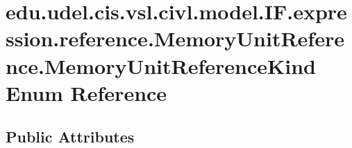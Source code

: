 \hypertarget{enumedu_1_1udel_1_1cis_1_1vsl_1_1civl_1_1model_1_1IF_1_1expression_1_1reference_1_1MemoryUnitRef64a306b012808a0db442488810ff9534}{}\section{edu.\+udel.\+cis.\+vsl.\+civl.\+model.\+I\+F.\+expression.\+reference.\+Memory\+Unit\+Reference.\+Memory\+Unit\+Reference\+Kind Enum Reference}
\label{enumedu_1_1udel_1_1cis_1_1vsl_1_1civl_1_1model_1_1IF_1_1expression_1_1reference_1_1MemoryUnitRef64a306b012808a0db442488810ff9534}
\subsection*{Public Attributes}
